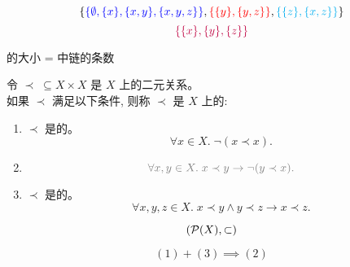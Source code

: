 \begin{frame}{}
  \[
    \{\textcolor{blue}{\{\emptyset, \{x\}, \{x, y\}, \{x, y, z\}\}},
      \textcolor{red}{\{\{y\}, \{y, z\}\}}, \textcolor{cyan}{\{\{z\}, \{x, z\}\}}\}
  \]
  \[
    \textcolor{purple}{\{\{x\}, \{y\}, \{z\}\}}
  \]

  \begin{theorem}
    的大小 = 中链的条数
  \end{theorem}
\end{frame}

\begin{frame}{}
  \begin{definition}
    令 $\prec\; \subseteq X \times X$ 是 $X$ 上的二元关系。\\[3pt]
    如果 $\prec$ 满足以下条件, 则称 $\prec$ 是 $X$ 上的: \\[6pt]

    \begin{enumerate}[(1)]
      \setlength{\itemsep}{6pt}
      \item $\prec$ 是的。
        \[
          \forall x \in X.\; \lnot(x \prec x).
        \]
      \item {}
        \[
          \gray{\forall x, y \in X.\; x \prec y \to \lnot (y \prec x).}
        \]
      \item $\prec$ 是的。
        \[
          \forall x, y, z \in X.\; x \prec y \land y \prec z \to x \prec z.
        \]
    \end{enumerate}
  \end{definition}
  \vspace{-0.20cm}
  \[
    (\mathcal{P}(X), \subset)
  \]

  \pause
  \vspace{-0.30cm}
  \[
    (1) + (3) \implies (2)
  \]
\end{frame}

